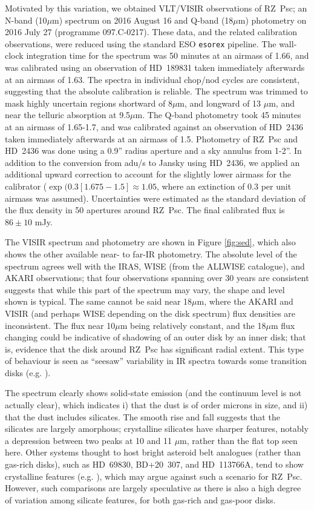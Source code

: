 \documentclass[]{rsos}
\begin{document}
Motivated by this variation, we obtained VLT/VISIR observations of RZ~Psc; an N-band
(10$\mu$m) spectrum on 2016 August 16 and Q-band (18$\mu$m) photometry on 2016 July 27
(programme 097.C-0217). These data, and the related calibration observations, were
reduced using the standard ESO \texttt{esorex} pipeline. The wall-clock integration time
for the spectrum was 50 minutes at an airmass of 1.66, and was calibrated using an
observation of HD~189831 taken immediately afterwards at an airmass of 1.63. The spectra
in individual chop/nod cycles are consistent, suggesting that the absolute calibration is
reliable. The spectrum was trimmed to mask highly uncertain regions shortward of 8$\mu$m,
and longward of 13 $\mu$m, and near the telluric absorption at 9.5$\mu$m. The Q-band
photometry took 45 minutes at an airmass of 1.65-1.7, and was calibrated against an
observation of HD~2436 taken immediately afterwards at an airmass of 1.5. Photometry of
RZ~Psc and HD~2436 was done using a 0.9'' radius aperture and a sky annulus from
1-2''. In addition to the conversion from adu/s to Jansky using HD~2436, we applied an
additional upward correction to account for the slightly lower airmass for the calibrator
($\exp(0.3 [1.675-1.5] \approx 1.05$, where an extinction of 0.3 per unit airmass was
assumed). Uncertainties were estimated as the standard deviation of the flux density in
50 apertures around RZ~Psc. The final calibrated flux is $86 \pm 10$ mJy.

The VISIR spectrum and photometry are shown in Figure \ref{fig:sed}, which also shows the
other available near- to far-IR photometry. The absolute level of the spectrum agrees
well with the IRAS, WISE (from the ALLWISE catalogue), and AKARI observations; that four
observations spanning over 30 years are consistent suggests that while this part of the
spectrum may vary, the shape and level shown is typical. The same cannot be said near
18$\mu$m, where the AKARI and VISIR (and perhaps WISE depending on the disk spectrum)
flux densities are inconsistent. The flux near 10$\mu$m being relatively constant, and
the 18$\mu$m flux changing could be indicative of shadowing of an outer disk by an inner
disk; that is, evidence that the disk around RZ~Psc has significant radial extent. This
type of behaviour is seen as ``seesaw'' variability in IR spectra towards some transition
disks (e.g. \cite{2011ApJ...728...49E,2012ApJ...748...71F}).

The spectrum clearly shows solid-state emission (and the continuum level is not actually
clear), which indicates i) that the dust is of order microns in size, and ii) that the
dust includes silicates. The smooth rise and fall suggests that the silicates are largely
amorphous; crystalline silicates have sharper features, notably a depression between two
peaks at 10 and 11 $\mu$m, rather than the flat top seen here. Other systems thought to
host bright asteroid belt analogues (rather than gas-rich disks), such as HD~69830,
BD+20~307, and HD~113766A, tend to show crystalline features
(e.g. \cite{2005ApJ...626.1061B,2005Natur.436..363S,2012A&A...542A..90O}), which may
argue against such a scenario for RZ~Psc. However, such comparisons are largely
speculative as there is also a high degree of variation among silicate features, for both
gas-rich and gas-poor disks.
\end{document}
